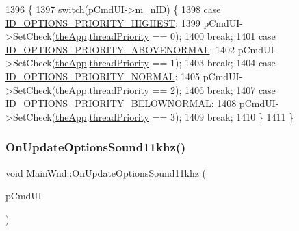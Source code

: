 \begin{DoxyCode}
1396 \{
1397   \textcolor{keywordflow}{switch}(pCmdUI->m\_nID) \{
1398   \textcolor{keywordflow}{case} \mbox{\hyperlink{resource_8h_a7d055b396f36189db72b4292a73ee67f}{ID\_OPTIONS\_PRIORITY\_HIGHEST}}:
1399     pCmdUI->SetCheck(\mbox{\hyperlink{_v_b_a_8cpp_a8095a9d06b37a7efe3723f3218ad8fb3}{theApp}}.\mbox{\hyperlink{class_v_b_a_acde3a2cf1f42d8222850f9e8b5b28316}{threadPriority}} == 0);
1400     \textcolor{keywordflow}{break};
1401   \textcolor{keywordflow}{case} \mbox{\hyperlink{resource_8h_a4d644159c178aabdb8e518a5d4e16cae}{ID\_OPTIONS\_PRIORITY\_ABOVENORMAL}}:
1402     pCmdUI->SetCheck(\mbox{\hyperlink{_v_b_a_8cpp_a8095a9d06b37a7efe3723f3218ad8fb3}{theApp}}.\mbox{\hyperlink{class_v_b_a_acde3a2cf1f42d8222850f9e8b5b28316}{threadPriority}} == 1);
1403     \textcolor{keywordflow}{break};
1404   \textcolor{keywordflow}{case} \mbox{\hyperlink{resource_8h_a53ed03b83c4843387c8c420b17f0234d}{ID\_OPTIONS\_PRIORITY\_NORMAL}}:
1405     pCmdUI->SetCheck(\mbox{\hyperlink{_v_b_a_8cpp_a8095a9d06b37a7efe3723f3218ad8fb3}{theApp}}.\mbox{\hyperlink{class_v_b_a_acde3a2cf1f42d8222850f9e8b5b28316}{threadPriority}} == 2);
1406     \textcolor{keywordflow}{break};
1407   \textcolor{keywordflow}{case} \mbox{\hyperlink{resource_8h_a850581d49023ab9dce04b2ac4e669b8e}{ID\_OPTIONS\_PRIORITY\_BELOWNORMAL}}:
1408     pCmdUI->SetCheck(\mbox{\hyperlink{_v_b_a_8cpp_a8095a9d06b37a7efe3723f3218ad8fb3}{theApp}}.\mbox{\hyperlink{class_v_b_a_acde3a2cf1f42d8222850f9e8b5b28316}{threadPriority}} == 3);
1409     \textcolor{keywordflow}{break};
1410   \}
1411 \}
\end{DoxyCode}
\mbox{\label{class_main_wnd_a5b856fbd35deabdd0478f976efa1b00f}} 
\subsubsection{\texorpdfstring{On\+Update\+Options\+Sound11khz()}{OnUpdateOptionsSound11khz()}}
{\footnotesize\ttfamily void Main\+Wnd\+::\+On\+Update\+Options\+Sound11khz (\begin{DoxyParamCaption}\item[{C\+Cmd\+UI $\ast$}]{p\+Cmd\+UI }\end{DoxyParamCaption})\hspace{0.3cm}{\ttfamily [protected]}}



